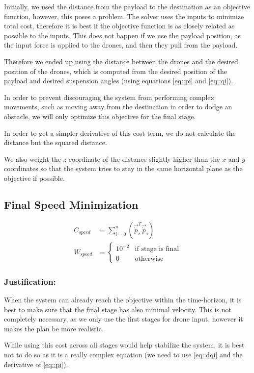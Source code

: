 Initially, we used the distance from the payload to the destination as an objective function, however, this poses a problem. The solver uses the inputs to minimize total cost, therefore it is best if the objective function is as closely related as possible to the inputs. This does not happen if we use the payload position, as the input force is applied to the drones, and then they pull from the payload.

Therefore we ended up using the distance between the drones and the desired position of the drones, which is computed from the desired position of the payload and desired suspension angles (using equations \ref{eq::pi} and \ref{eq::qi}).

In order to prevent discouraging the system from performing complex movements, such as moving away from the destination in order to dodge an obstacle, we will only optimize this objective for the final stage.

In order to get a simpler derivative of this cost term, we do not calculate the distance but the squared distance.

We also weight the $z$ coordinate of the distance slightly higher than the $x$ and $y$ coordinates so that the system tries to stay in the same horizontal plane as the objective if possible.

\subsection{Final Speed Minimization}
\begin{align}
C_{speed} & = \sum_{i=0}^{n}\left(
\vec{\dot p}_i^T
\vec{\dot p}_i
\right)
\\
W_{speed} & = 
\begin{cases}
10^{-2} & \text{if stage is final}
\\ 0 & \text{otherwise}
\end{cases}
\end{align}
\subsubsection{Justification:}
When the system can already reach the objective within the time-horizon, it is best to make sure that the final stage has also minimal velocity. This is not completely necessary, as we only use the first stages for drone input, however it makes the plan be more realistic. 

While using this cost across all stages would help stabilize the system, it is best not to do so as it is a really complex equation (we need to use \cref{eq::dqi} and the derivative of \cref{eq::pi}).

